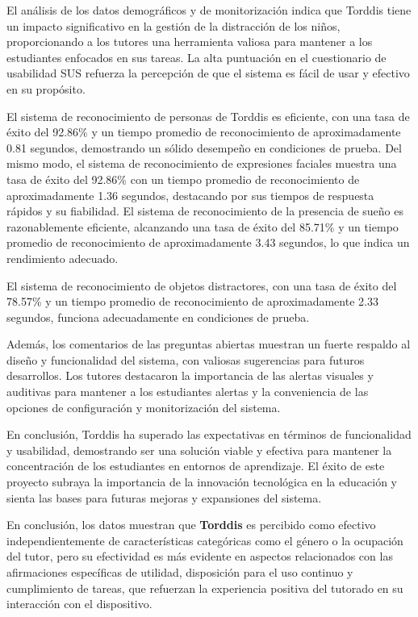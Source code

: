 \documentclass[a4paper,fleqn]{cas-sc}
\begin{document}
		El análisis de los datos demográficos y de monitorización indica que Torddis tiene un impacto significativo en la gestión de la distracción de los niños, proporcionando a los tutores una herramienta valiosa para mantener a los estudiantes enfocados en sus tareas. La alta puntuación en el cuestionario de usabilidad SUS refuerza la percepción de que el sistema es fácil de usar y efectivo en su propósito.
		
		El sistema de reconocimiento de personas de Torddis es eficiente, con una tasa de éxito del 92.86\% y un tiempo promedio de reconocimiento de aproximadamente 0.81 segundos, demostrando un sólido desempeño en condiciones de prueba. Del mismo modo, el sistema de reconocimiento de expresiones faciales muestra una tasa de éxito del 92.86\% con un tiempo promedio de reconocimiento de aproximadamente 1.36 segundos, destacando por sus tiempos de respuesta rápidos y su fiabilidad. El sistema de reconocimiento de la presencia de sueño es razonablemente eficiente, alcanzando una tasa de éxito del 85.71\% y un tiempo promedio de reconocimiento de aproximadamente 3.43 segundos, lo que indica un rendimiento adecuado.
		
		El sistema de reconocimiento de objetos distractores, con una tasa de éxito del 78.57\% y un tiempo promedio de reconocimiento de aproximadamente 2.33 segundos, funciona adecuadamente en condiciones de prueba.
		
		Además, los comentarios de las preguntas abiertas muestran un fuerte respaldo al diseño y funcionalidad del sistema, con valiosas sugerencias para futuros desarrollos. Los tutores destacaron la importancia de las alertas visuales y auditivas para mantener a los estudiantes alertas y la conveniencia de las opciones de configuración y monitorización del sistema.
		
		En conclusión, Torddis ha superado las expectativas en términos de funcionalidad y usabilidad, demostrando ser una solución viable y efectiva para mantener la concentración de los estudiantes en entornos de aprendizaje. El éxito de este proyecto subraya la importancia de la innovación tecnológica en la educación y sienta las bases para futuras mejoras y expansiones del sistema.
			
		En conclusión, los datos muestran que \textbf{Torddis} es percibido como efectivo independientemente de características categóricas como el género o la ocupación del tutor, pero su efectividad es más evidente en aspectos relacionados con las afirmaciones específicas de utilidad, disposición para el uso continuo y cumplimiento de tareas, que refuerzan la experiencia positiva del tutorado en su interacción con el dispositivo.	
		
\end{document}
